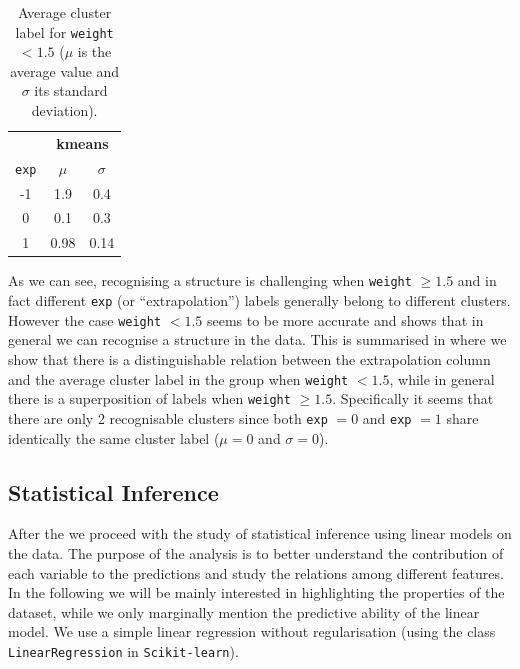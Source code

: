 \begin{table}[htbp]
  \centering
  \begin{tabular}{@{}ccc@{}}
  \toprule
               & \multicolumn{2}{c}{\textbf{kmeans}} \\
  \texttt{exp} & $\mu$             & $\sigma$        \\ \midrule
  -1           & 1.9               & 0.4             \\
  0            & 0.1               & 0.3             \\
  1            & 0.98              & 0.14            \\ \bottomrule
  \end{tabular}%
  \caption{Average cluster label for \texttt{weight} $< 1.5$ ($\mu$ is the average value and $\sigma$ its standard deviation).}
  \label{tab:lumps:kmeans}
\end{table}

As we can see, recognising a structure is challenging when \texttt{weight} $\ge 1.5$ and in fact different \texttt{exp} (or ``extrapolation'') labels generally belong to different clusters.
However the case \texttt{weight} $< 1.5$ seems to be more accurate and shows that in general we can recognise a structure in the data.
This is summarised in  where we show that there is a distinguishable relation between the extrapolation column and the average cluster label in the group
when \texttt{weight} $< 1.5$, while in general there is a superposition of
labels when \texttt{weight} $\ge 1.5$.
Specifically it seems that there are only 2 recognisable clusters since both \texttt{exp} $= 0$ and \texttt{exp} $= 1$ share identically the same cluster label ($\mu = 0$ and $\sigma = 0$).


\subsection{Statistical Inference}

After the \eda we proceed with the study of statistical inference using linear models on the data.
The purpose of the analysis is to better understand the contribution of each variable to the predictions and study the relations among different features.
In the following we will be mainly interested in highlighting the properties of the dataset, while we only marginally mention the predictive ability of the linear model.
We use a simple linear regression without regularisation (using the class \texttt{LinearRegression} in \texttt{Scikit-learn}).

